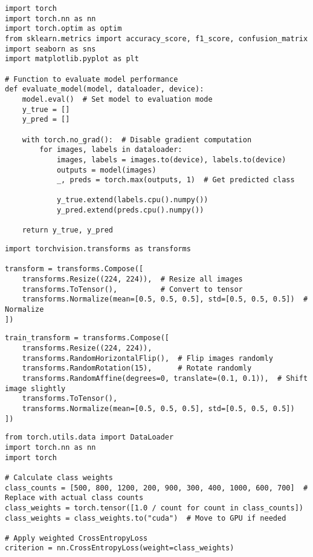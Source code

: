 \documentclass{article}
\begin{document}
\begin{verbatim}
import torch
import torch.nn as nn
import torch.optim as optim
from sklearn.metrics import accuracy_score, f1_score, confusion_matrix
import seaborn as sns
import matplotlib.pyplot as plt

# Function to evaluate model performance
def evaluate_model(model, dataloader, device):
    model.eval()  # Set model to evaluation mode
    y_true = []
    y_pred = []

    with torch.no_grad():  # Disable gradient computation
        for images, labels in dataloader:
            images, labels = images.to(device), labels.to(device)
            outputs = model(images)
            _, preds = torch.max(outputs, 1)  # Get predicted class

            y_true.extend(labels.cpu().numpy())
            y_pred.extend(preds.cpu().numpy())

    return y_true, y_pred

\end{verbatim}

\begin{verbatim}
import torchvision.transforms as transforms

transform = transforms.Compose([
    transforms.Resize((224, 224)),  # Resize all images
    transforms.ToTensor(),          # Convert to tensor
    transforms.Normalize(mean=[0.5, 0.5, 0.5], std=[0.5, 0.5, 0.5])  # Normalize
])

\end{verbatim}

\begin{verbatim}
train_transform = transforms.Compose([
    transforms.Resize((224, 224)),
    transforms.RandomHorizontalFlip(),  # Flip images randomly
    transforms.RandomRotation(15),      # Rotate randomly
    transforms.RandomAffine(degrees=0, translate=(0.1, 0.1)),  # Shift image slightly
    transforms.ToTensor(),
    transforms.Normalize(mean=[0.5, 0.5, 0.5], std=[0.5, 0.5, 0.5])
])

\end{verbatim}

\begin{verbatim}
from torch.utils.data import DataLoader
import torch.nn as nn
import torch

# Calculate class weights
class_counts = [500, 800, 1200, 200, 900, 300, 400, 1000, 600, 700]  # Replace with actual class counts
class_weights = torch.tensor([1.0 / count for count in class_counts])
class_weights = class_weights.to("cuda")  # Move to GPU if needed

# Apply weighted CrossEntropyLoss
criterion = nn.CrossEntropyLoss(weight=class_weights)

\end{verbatim}
\end{document}
